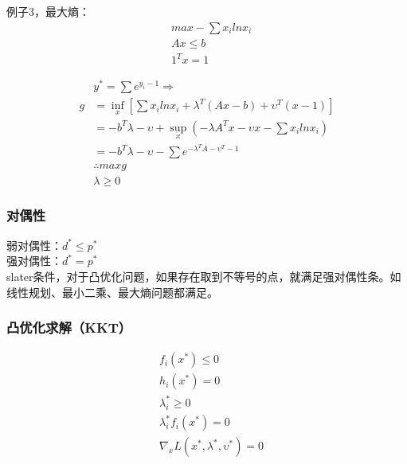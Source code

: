 \documentclass[UTF8]{../computerUniverse}
\begin{document}
例子3，最大熵：
\begin{equation}
\begin{split}
&max -\sum x_ilnx_i\\
&Ax\leqslant b\\
&1^Tx=1
\end{split}
\end{equation}

\begin{equation}
\begin{split}
&y^*=\sum e^{y_i-1} \Rightarrow\\
g&=\inf_x \left[ \sum x_ilnx_i+\lambda^T(Ax-b)+\upsilon^T(x-1) \right]\\
&=-b^T\lambda-\upsilon+\sup_x \left( -\lambda A^Tx-\upsilon x-\sum x_ilnx_i \right)\\
&=-b^T\lambda -\upsilon-\sum e^{-\lambda^TA-\upsilon^T-1}\\
&\therefore max g \\
&\lambda \geqslant 0
\end{split}
\end{equation}
 
\subsubsection{对偶性}
弱对偶性：$d^*\leqslant p^*$\\
强对偶性：$d^* = p^*$\\
slater条件，对于凸优化问题，如果存在取到不等号的点，就满足强对偶性条。如线性规划、最小二乘、最大熵问题都满足。

\subsubsection{凸优化求解（KKT）}
\begin{equation}
\begin{split}
&f_i(x^*)\leqslant0\\
&h_i(x^*)=0\\
&\lambda_i^*\geqslant 0\\
&\lambda_i^*f_i(x^*)=0\\
&\nabla_x L(x^*,\lambda^*,\upsilon^*)=0
\end{split}
\end{equation}
 
\end{document}
